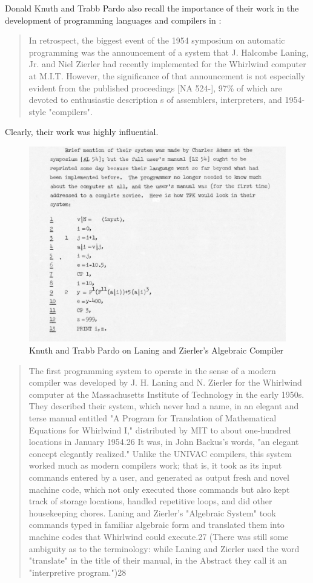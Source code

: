Donald Knuth and Trabb Pardo also recall the importance of their work in
the development of programming languages and compilers
in :

\begin{quotation}
	In retrospect, the biggest event of the 1954 symposium on automatic
	programming was the announcement of a system that J. Halcombe Laning, Jr. and Niel Zierler
	had recently implemented for the Whirlwind computer at M.I.T.  However, the
	significance of that announcement is not especially evident from the published
	proceedings [NA 524-], 97\% of which are devoted to enthusiastic description s
	of assemblers, interpreters, and 1954-style "compilers".
\end{quotation}

Clearly, their work was highly influential.

\begin{figure}[h!]
	\centering
	\includegraphics[width=0.5\linewidth]{resource/knuth_pardo_on_laning_zierlers_algebraic_compiler.png}
	\caption{Knuth and Trabb Pardo on Laning and Zierler's Algebraic Compiler}
	\label{fig:knuth-pardo-on-laning-zierler}
\end{figure}

\begin{quotation}
	The first programming system to operate in the sense of a modern compiler was
	developed by J. H. Laning and N. Zierler for the Whirlwind computer at the
	Massachusetts Institute of Technology in the early 1950s. They described their
	system, which never had a name, in an elegant and terse manual entitled "A
	Program for Translation of Mathematical Equations for Whirlwind I,"
	distributed
	by MIT to about one-hundred locations in January 1954.26 It was, in John
	Backus's words, "an elegant concept elegantly realized." Unlike the UNIVAC
	compilers, this system worked much as modern compilers work; that is, it took
	as its input commands entered by a user, and generated as output fresh and
	novel machine code, which not only executed those commands but also kept track
	of storage locations, handled repetitive loops, and did other housekeeping
	chores. Laning and Zierler's "Algebraic System" took commands typed
	in familiar
	algebraic form and translated them into machine codes that Whirlwind could
	execute.27 (There was still some ambiguity as to the terminology: while Laning
	and Zierler used the word "translate" in the title of their manual, in the
	Abstract they call it an "interpretive program.")28
	\cite{new-history-of-modern-computing}
\end{quotation}


